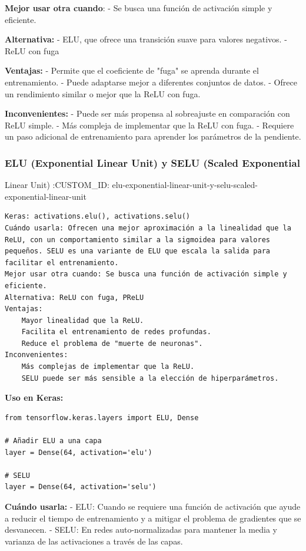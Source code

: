 \documentclass[11pt]{article}
\begin{document}
\textbf{Mejor usar otra cuando}: - Se busca una función de activación simple y
eficiente.

\textbf{Alternativa:} - ELU, que ofrece una transición suave para valores
negativos. - ReLU con fuga

\textbf{Ventajas:} - Permite que el coeficiente de "fuga" se aprenda durante el
entrenamiento. - Puede adaptarse mejor a diferentes conjuntos de
datos. - Ofrece un rendimiento similar o mejor que la ReLU con fuga.

\textbf{Inconvenientes:} - Puede ser más propensa al sobreajuste en comparación
con ReLU simple. - Más compleja de implementar que la ReLU con fuga. -
Requiere un paso adicional de entrenamiento para aprender los parámetros
de la pendiente.

\subsubsection{ELU (Exponential Linear Unit) y SELU (Scaled Exponential}
\label{sec:orgf62e446}
Linear Unit)
:CUSTOM\_ID: elu-exponential-linear-unit-y-selu-scaled-exponential-linear-unit

\begin{verbatim}
Keras: activations.elu(), activations.selu()
Cuándo usarla: Ofrecen una mejor aproximación a la linealidad que la ReLU, con un comportamiento similar a la sigmoidea para valores pequeños. SELU es una variante de ELU que escala la salida para facilitar el entrenamiento.
Mejor usar otra cuando: Se busca una función de activación simple y eficiente.
Alternativa: ReLU con fuga, PReLU
Ventajas:
    Mayor linealidad que la ReLU.
    Facilita el entrenamiento de redes profundas.
    Reduce el problema de "muerte de neuronas".
Inconvenientes:
    Más complejas de implementar que la ReLU.
    SELU puede ser más sensible a la elección de hiperparámetros.
\end{verbatim}

\textbf{Uso en Keras:}

\begin{verbatim}
from tensorflow.keras.layers import ELU, Dense

# Añadir ELU a una capa
layer = Dense(64, activation='elu')

# SELU
layer = Dense(64, activation='selu')
\end{verbatim}

\textbf{Cuándo usarla:} - ELU: Cuando se requiere una función de activación que
ayude a reducir el tiempo de entrenamiento y a mitigar el problema de
gradientes que se desvanecen. - SELU: En redes auto-normalizadas para
mantener la media y varianza de las activaciones a través de las capas.
\end{document}
